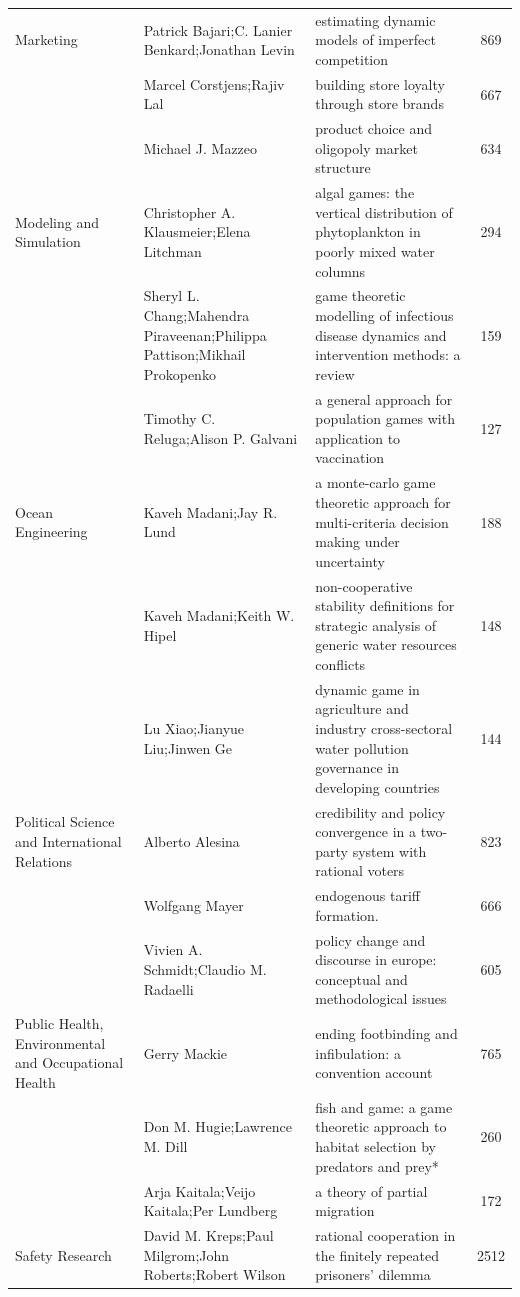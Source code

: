 \documentclass[
  12pt,
]{article}
\begin{document}
\begin{longtable}[t]{|>{\raggedright\arraybackslash}p{4cm}>{\raggedright\arraybackslash}p{4cm}>{\raggedright\arraybackslash}p{4cm}>{}c|}
Marketing & Patrick Bajari;C. Lanier Benkard;Jonathan Levin & estimating dynamic models of imperfect competition & 869\\
 & Marcel Corstjens;Rajiv Lal & building store loyalty through store brands & 667\\
 & Michael J. Mazzeo & product choice and oligopoly market structure & 634\\
Modeling and Simulation & Christopher A. Klausmeier;Elena Litchman & algal games: the vertical distribution of phytoplankton in poorly mixed water columns & 294\\
 & Sheryl L. Chang;Mahendra Piraveenan;Philippa Pattison;Mikhail Prokopenko & game theoretic modelling of infectious disease dynamics and intervention methods: a review & 159\\
 & Timothy C. Reluga;Alison P. Galvani & a general approach for population games with application to vaccination & 127\\
Ocean Engineering & Kaveh Madani;Jay R. Lund & a monte-carlo game theoretic approach for multi-criteria decision making under uncertainty & 188\\
 & Kaveh Madani;Keith W. Hipel & non-cooperative stability definitions for strategic analysis of generic water resources conflicts & 148\\
 & Lu Xiao;Jianyue Liu;Jinwen Ge & dynamic game in agriculture and industry cross-sectoral water pollution governance in developing countries & 144\\
Political Science and International Relations & Alberto Alesina & credibility and policy convergence in a two-party system with rational voters & 823\\
 & Wolfgang Mayer & endogenous tariff formation. & 666\\
 & Vivien A. Schmidt;Claudio M. Radaelli & policy change and discourse in europe: conceptual and methodological issues & 605\\
Public Health, Environmental and Occupational Health & Gerry Mackie & ending footbinding and infibulation: a convention account & 765\\
 & Don M. Hugie;Lawrence M. Dill & fish and game: a game theoretic approach to habitat selection by predators and prey* & 260\\
 & Arja Kaitala;Veijo Kaitala;Per Lundberg & a theory of partial migration & 172\\
Safety Research & David M. Kreps;Paul Milgrom;John Roberts;Robert Wilson & rational cooperation in the finitely repeated prisoners' dilemma & 2512\\

\end{longtable}
\end{document}
